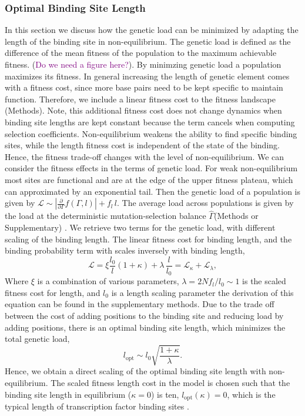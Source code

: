 \documentclass[10pt,a4paper]{article}
\newcommand{\purple}[1]{\textcolor{purple}{#1}}
\begin{document}
	\subsubsection*{Optimal Binding Site Length}
	In this section we discuss how the genetic load can be minimized by adapting the length of the binding site in non-equilibrium. The genetic load is defined as the difference of the mean fitness of the population to the maximum achievable fitness. (\purple{Do we need a figure here?}). By minimzing genetic load a population maximizes its fitness. In general increasing the length of genetic element comes with a fitness cost, since more base pairs need to be kept specific to maintain function. Therefore, we include a linear fitness cost to the fitness landscape (Methods). Note, this additional fitness cost does not change dynamics when binding site lengths are kept constant because the term cancels when computing selection coefficients.
	Non-equilibrium weakens the ability to find specific binding sites, while the length fitness cost is independent of the state of the binding. Hence, the fitness trade-off changes with the level of non-equilibrium. We can consider the fitness effects in the terms of genetic load. For weak non-equilibrium most sites are functional and are at the edge of the upper fitness plateau, which can approximated by an exponential tail. Then the genetic load of a population is given by $\mathcal{L}\sim \left|\frac{\partial}{\partial \Gamma} f(\Gamma,l)\right|+f_l\,l$. The average load across populations is given by the load at the deterministic mutation-selection balance $\hat{\Gamma}$(Methods or Supplementary) \cite{held_survival_2019}. We retrieve two terms for the genetic load, with different scaling of the binding length. The linear fitness cost for binding length, and the binding probability term with scales inversely with binding length,
	\begin{equation}
		\mathcal{L} = \xi \frac{l_0}{l}(1+\kappa)+\lambda \, \frac{l}{l_0} = \mathcal{L}_\kappa + \mathcal{L}_\lambda,
		\label{equ:maintext_load}
	\end{equation}
	Where $\xi$ is a combination of various parameters, $\lambda=2Nf_l/l_0\sim 1$ is the scaled fitness cost for length,  and $l_0$ is a length scaling parameter the derivation of this equation can be found in the supplementary methods. Due to the trade off between the cost of adding positions to the binding site and reducing load by adding positions, there is an optimal binding site length, which minimizes the total genetic load,
	\begin{equation}
		l_\mathrm{opt}\sim l_0\sqrt{\frac{1+\kappa}{\lambda}}.
	\end{equation}
	Hence, we obtain a direct scaling of the optimal binding site length with non-equilibrium. The scaled fitness length cost in the model is chosen such that the binding site length in equilibrium ($\kappa=0$) is ten, $l_\mathrm{opt}(\kappa)=0$, which is the typical length of transcription factor binding sites \cite{stewart_why_2012}. 
\end{document}
